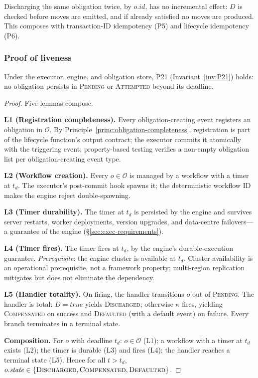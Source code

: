 \begin{invariant}
\label{inv:P23}\label{inv:obligation-idempotency}
Discharging the same obligation twice, by $o.\mathit{id}$, has no incremental effect: $D$ is checked before moves are emitted, and if already satisfied no moves are produced. This composes with transaction-ID idempotency (P5) and lifecycle idempotency (P6).
\end{invariant}

\subsubsection{Proof of liveness}
\label{sec:liveness-proof}

\begin{theorem}
\label{thm:obligation-liveness}
Under the executor, engine, and obligation store, P21 (Invariant~\ref{inv:P21}) holds: no obligation persists in \textsc{Pending} or \textsc{Attempted} beyond its deadline.
\end{theorem}

\begin{proof}
Five lemmas compose.

\textbf{L1 (Registration completeness).} Every obligation-creating event registers an obligation in $\mathcal{O}$. By Principle~\ref{princ:obligation-completeness}, registration is part of the lifecycle function's output contract; the executor commits it atomically with the triggering event; property-based testing verifies a non-empty obligation list per obligation-creating event type.

\textbf{L2 (Workflow creation).} Every $o \in \mathcal{O}$ is managed by a workflow with a timer at $t_d$. The executor's post-commit hook spawns it; the deterministic workflow ID makes the engine reject double-spawning.

\textbf{L3 (Timer durability).} The timer at $t_d$ is persisted by the engine and survives server restarts, worker deployments, version upgrades, and data-centre failovers---a guarantee of the engine (\S\ref{sec:exec-requirements}).

\textbf{L4 (Timer fires).} The timer fires at $t_d$, by the engine's durable-execution guarantee. \textit{Prerequisite}: the engine cluster is available at $t_d$. Cluster availability is an operational prerequisite, not a framework property; multi-region replication mitigates but does not eliminate the dependency.

\textbf{L5 (Handler totality).} On firing, the handler transitions $o$ out of \textsc{Pending}. The handler is total: $D = \mathit{true}$ yields \textsc{Discharged}; otherwise $\kappa$ fires, yielding \textsc{Compensated} on success and \textsc{Defaulted} (with a default event) on failure. Every branch terminates in a terminal state.

\textbf{Composition.} For $o$ with deadline $t_d$: $o \in \mathcal{O}$ (L1); a workflow with a timer at $t_d$ exists (L2); the timer is durable (L3) and fires (L4); the handler reaches a terminal state (L5). Hence for all $t > t_d$, $o.\mathit{state} \in \{\textsc{Discharged}, \textsc{Compensated}, \textsc{Defaulted}\}$.
\end{proof}

